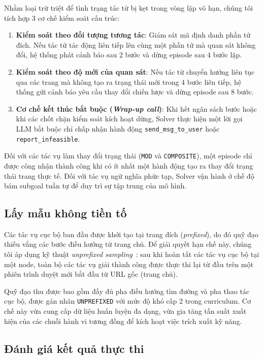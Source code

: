 Nhằm loại trừ triệt để tình trạng tác tử bị kẹt trong vòng lặp vô hạn, chúng tôi tích hợp 3 cơ chế kiểm soát cấu trúc:
\begin{enumerate}
  \item \textbf{Kiểm soát theo đối tượng tương tác}: Giám sát mã định danh phần tử đích. Nếu tác tử tác động liên tiếp lên cùng một phần tử mà quan sát không đổi, hệ thống phát cảnh báo sau 2 bước và dừng episode sau 4 bước lặp.
  \item \textbf{Kiểm soát theo độ mới của quan sát}: Nếu tác tử chuyển hướng liên tục qua các trang mà không tạo ra trạng thái mới trong 4 bước liên tiếp, hệ thống gửi cảnh báo yêu cầu thay đổi chiến lược và dừng episode sau 8 bước.
  \item \textbf{Cơ chế kết thúc bắt buộc (\textit{Wrap-up call})}: Khi hết ngân sách bước hoặc khi các chốt chặn kiểm soát kích hoạt dừng, Solver thực hiện một lời gọi LLM bắt buộc chỉ chấp nhận hành động \texttt{send\_msg\_to\_user} hoặc \texttt{report\_infeasible}.
\end{enumerate}

Đối với các tác vụ làm thay đổi trạng thái (\texttt{MOD} và \texttt{COMPOSITE}), một episode chỉ được công nhận thành công khi có ít nhất một hành động tạo ra thay đổi trạng thái trang thực tế. Đối với tác vụ ngữ nghĩa phức tạp, Solver vận hành ở chế độ bám subgoal tuần tự để duy trì sự tập trung của mô hình.

\subsection{Lấy mẫu không tiền tố}
\label{sec:method-unprefixed}

Các tác vụ cục bộ ban đầu được khởi tạo tại trang đích (\textit{prefixed}), do đó quỹ đạo thiếu vắng các bước điều hướng từ trang chủ. Để giải quyết hạn chế này, chúng tôi áp dụng kỹ thuật \textit{unprefixed sampling}~\cite{gandhi2026gobrowse}: sau khi hoàn tất các tác vụ cục bộ tại một node, toàn bộ các tác vụ giải thành công được thực thi lại từ đầu trên một phiên trình duyệt mới bắt đầu từ URL gốc (trang chủ).

Quỹ đạo thu được bao gồm đầy đủ pha điều hướng tìm đường và pha thao tác cục bộ, được gán nhãn \texttt{UNPREFIXED} với mức độ khó cấp 2 trong curriculum. Cơ chế này vừa cung cấp dữ liệu huấn luyện đa dạng, vừa gia tăng tần suất xuất hiện của các chuỗi hành vi tương đồng để kích hoạt việc trích xuất kỹ năng.

\subsection{Đánh giá kết quả thực thi}
\label{sec:method-success}

